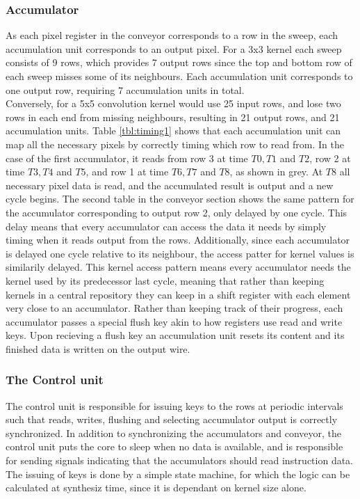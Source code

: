 \subsubsection{Accumulator}
As each pixel register in the conveyor corresponds to a row in the sweep, each accumulation unit corresponds to an output pixel.
For a 3x3 kernel each sweep consists of 9 rows, which provides 7 output rows since the top and bottom row of each sweep misses some of its neighbours.
Each accumulation unit corresponds to one output row, requiring 7 accumulation units in total.\\
Conversely, for a 5x5 convolution kernel would use 25 input rows, and lose two rows in each end from missing neighbours, resulting in 21 output rows, and 21 accumulation units.
Table \ref{tbl:timing1} shows that each accumulation unit can map all the necessary pixels by correctly timing which row to read from.
In the case of the first accumulator, it reads from row 3 at time $T0, T1$ and $T2$, row 2 at time $T3, T4$ and $T5$, and row 1 at time $T6, T7$ and $T8$, as shown in grey.
At $T8$ all necessary pixel data is read, and the accumulated result is output and a new cycle begins.
The second table in the conveyor section shows the same pattern for the accumulator corresponding to output row 2, only delayed by one cycle.
This delay means that every accumulator can access the data it needs by simply timing when it reads output from the rows.
Additionally, since each accumulator is delayed one cycle relative to its neighbour, the access patter for kernel values is similarily delayed.
This kernel access pattern means every accumulator needs the kernel used by its predecessor last cycle, meaning that rather than keeping kernels in a central repository they can keep in a shift register with each element very close to an accumulator.
Rather than keeping track of their progress, each accumulator passes a special flush key akin to how registers use read and write keys. Upon recieving a flush key an accumulation unit resets its content and its finished data is written on the output wire.

\subsubsection{The Control unit}
The control unit is responsible for issuing keys to the rows at periodic intervals such that reads, writes, flushing and selecting accumulator output is correctly synchronized.
In addition to synchronizing the accumulators and conveyor, the control unit puts the core to sleep when no data is available, and is responsible for sending signals indicating that the accumulators should read instruction data.
The issuing of keys is done by a simple state machine, for which the logic can be calculated at synthesiz time, since it is dependant on kernel size alone. 

